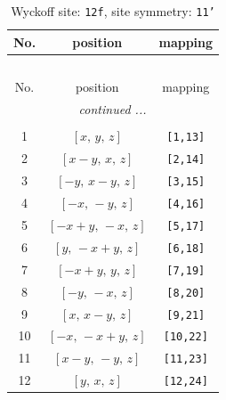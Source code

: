 \documentclass[fleqn,8pt]{jsarticle}
\begin{document}
\begin{longtable}{ccc}
\caption{Wyckoff site: {\tt 12f}, site symmetry: {\tt 11'}}
 \\
 \hline \hline
No. & position & mapping \\ \hline \endfirsthead

\multicolumn{2}{l}{\tablename\ \thetable{}} \\
 \hline \hline
No. & position & mapping \\ \hline \endhead

 \hline \hline
\multicolumn{2}{r}{\footnotesize\it continued ...} \\ \endfoot

 \hline \hline
\multicolumn{2}{r}{} \\ \endlastfoot

1 & $\left[ x,\, y,\, z \right]$ & {\tt [1,13]} \\ \hline
2 & $\left[ x - y,\, x,\, z \right]$ & {\tt [2,14]} \\ \hline
3 & $\left[ - y,\, x - y,\, z \right]$ & {\tt [3,15]} \\ \hline
4 & $\left[ - x,\, - y,\, z \right]$ & {\tt [4,16]} \\ \hline
5 & $\left[ - x + y,\, - x,\, z \right]$ & {\tt [5,17]} \\ \hline
6 & $\left[ y,\, - x + y,\, z \right]$ & {\tt [6,18]} \\ \hline
7 & $\left[ - x + y,\, y,\, z \right]$ & {\tt [7,19]} \\ \hline
8 & $\left[ - y,\, - x,\, z \right]$ & {\tt [8,20]} \\ \hline
9 & $\left[ x,\, x - y,\, z \right]$ & {\tt [9,21]} \\ \hline
10 & $\left[ - x,\, - x + y,\, z \right]$ & {\tt [10,22]} \\ \hline
11 & $\left[ x - y,\, - y,\, z \right]$ & {\tt [11,23]} \\ \hline
12 & $\left[ y,\, x,\, z \right]$ & {\tt [12,24]} \\
\end{longtable}
\end{document}
